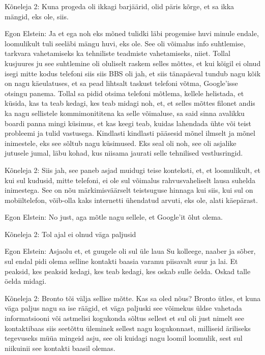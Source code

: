 Kõneleja 2:
Kuna progeda oli ikkagi barjäärid, olid päris kõrge, et sa ikka mängid, eks ole, siis.
                 
Egon Elstein:
Ja et ega noh eks mõned tulidki läbi progemise huvi minule endale, loomulikult tuli seeläbi mängu huvi, eks ole. See oli võimalus info suhtlemise, tarkvara vahetamiseks ka tehniliste teadmiste vahetamiseks, niiet.
Tollal kusjuures ju see suhtlemine oli oluliselt raskem selles mõttes, et kui kõigil ei olnud isegi mitte kodus telefoni siis siis BBS oli jah, et siis tänapäeval tundub nagu kõik on nagu käeulatuses, et sa pead lihtsalt taskust telefoni võtma, Google'isse otsingu panema. Tollal sa pidid otsima telefoni mõtlema, kellele helistada, et küsida, kas ta teab kedagi, kes teab midagi noh, et, et selles mõttes filonet andis ka nagu sellistele kommimonititena ka selle võimaluse, sa said sinna avalikku boardi panna mingi küsimus, et kas keegi teab, kuidas lahendada ühte või teist probleemi ja tulid vastusega.
Kindlasti kindlasti pääsesid mõnel ilmselt ja mõnel inimestele, eks see sõltub nagu küsimused. Eks seal oli noh, see oli asjalike jutusele jumal, läbu kohad, kus niisama jaurati selle tehnilised vestlusringid.
                 
Kõneleja 2:
Siis jah, see paneb asjad muidugi teise konteksti, et, et loomulikult, et kui sul kudusid, mitte telefoni, ei ole sul võimalus rahvusvaheliselt lausa suhelda inimestega. See on nõu märkimisväärselt teistsuguse hinnaga kui siis, kui sul on mobiiltelefon, võib-olla kaks internetti ühendatud arvuti, eks ole, alati käepärast.
                 
Egon Elstein:
No just, aga mõtle nagu sellele, et Google'it õlut olema.
                 
Kõneleja 2:
Tol ajal ei olnud väga paljusid
                 
Egon Elstein:
Asjaolu et, et guugele oli sul üle laua Su kolleege, naaber ja sõber, sul endal pidi olema selline kontakti baasia varamu piisavalt suur ja lai. Et peaksid, kes peaksid kedagi, kes teab kedagi, kes oskab sulle öelda. Oskad talle öelda midagi.
                 
Kõneleja 2:
Bronto tõi välja sellise mõtte. Kas sa oled nõus? Bronto ütles, et kuna väga paljus nagu sa ise räägid, et väga paljuski see võimekus üldse vahetada informatsiooni või astmelisi kogukonda sõltus sellest et sul oli just nimelt see kontaktibaas siis seetõttu üleminek sellest nagu kogukonnast, milliseid äriliseks tegevuseks müüa mingeid asju, see oli kuidagi nagu loomil loomulik, sest sul niikuinii see kontakti baasil olemas.
                 
